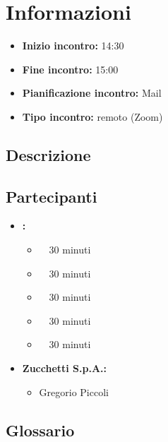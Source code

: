 \section{Informazioni}
\begin{itemize}
	\item \textbf{Inizio incontro:} 14:30
	\item \textbf{Fine incontro:} 15:00
	\item \textbf{Pianificazione incontro:} Mail
	\item \textbf{Tipo incontro:} remoto (Zoom)
\end{itemize}

\subsection{Descrizione}
\DocDescription

\subsection{Partecipanti}

\begin{itemize}
	\item \textbf{\GroupName:}
	\begin{itemize}
		\item \tommaso \ \rightarrow\ 30 minuti
		\item \riccardo \ \rightarrow\ 30 minuti
		\item \raul \ \rightarrow\ 30 minuti 
		\item \martina \ \rightarrow\ 30 minuti 
		\item \sebastiano \ \rightarrow\ 30  minuti 
	\end{itemize}
	\item \textbf{Zucchetti S.p.A.:}
    \begin{itemize}
        \item Gregorio Piccoli
    \end{itemize}
\end{itemize}

\subsection{Glossario}
\GlossarioIntroduzioneVE

\clearpage